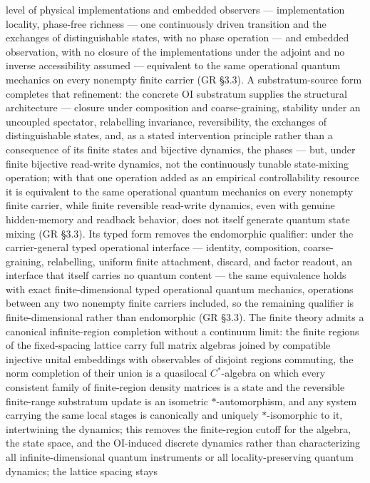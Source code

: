 \documentclass[
]{article}
\begin{document}
level of physical implementations and embedded observers ---
implementation locality, phase-free richness --- one continuously driven
transition and the exchanges of distinguishable states, with no phase
operation --- and embedded observation, with no closure of the
implementations under the adjoint and no inverse accessibility assumed
--- equivalent to the same operational quantum mechanics on every
nonempty finite carrier (GR §3.3). A substratum-source form completes
that refinement: the concrete OI substratum supplies the structural
architecture --- closure under composition and coarse-graining,
stability under an uncoupled spectator, relabelling invariance,
reversibility, the exchanges of distinguishable states, and, as a stated
intervention principle rather than a consequence of its finite states
and bijective dynamics, the phases --- but, under finite bijective
read-write dynamics, not the continuously tunable state-mixing
operation; with that one operation added as an empirical controllability
resource it is equivalent to the same operational quantum mechanics on
every nonempty finite carrier, while finite reversible read-write
dynamics, even with genuine hidden-memory and readback behavior, does
not itself generate quantum state mixing (GR §3.3). Its typed form
removes the endomorphic qualifier: under the carrier-general typed
operational interface --- identity, composition, coarse-graining,
relabelling, uniform finite attachment, discard, and factor readout, an
interface that itself carries no quantum content --- the same
equivalence holds with exact finite-dimensional typed operational
quantum mechanics, operations between any two nonempty finite carriers
included, so the remaining qualifier is finite-dimensional rather than
endomorphic (GR §3.3). The finite theory admits a canonical
infinite-region completion without a continuum limit: the finite regions
of the fixed-spacing lattice carry full matrix algebras joined by
compatible injective unital embeddings with observables of disjoint
regions commuting, the norm completion of their union is a quasilocal
\(C^{*}\)-algebra on which every consistent family of finite-region
density matrices is a state and the reversible finite-range substratum
update is an isometric \(*\)-automorphism, and any system carrying the
same local stages is canonically and uniquely \(*\)-isomorphic to it,
intertwining the dynamics; this removes the finite-region cutoff for the
algebra, the state space, and the OI-induced discrete dynamics rather
than characterizing all infinite-dimensional quantum instruments or all
locality-preserving quantum dynamics; the lattice spacing stays
\end{document}
